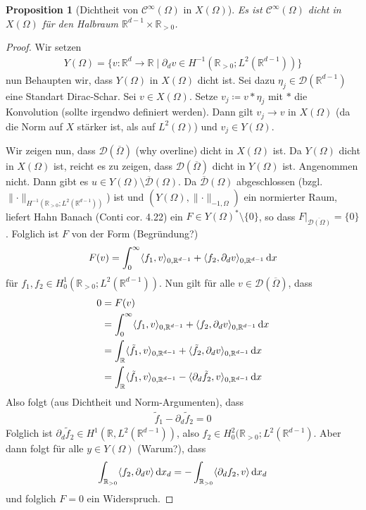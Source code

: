 \documentclass{scrartcl}
\newcounter{everything}
\newtheorem{proposition}[everything]{Proposition}
\def\R{\mathbb{R}}
\newcommand{\cC}{\mathcal{C}}
\newcommand{\cD}{\mathcal{D}}
\newcommand{\dif}[1]{\,\mathrm{d} #1}
\newcommand{\norm}[1]{\lVert #1 \rVert}
\DeclarePairedDelimiter{\inner}{\langle}{\rangle}
\begin{document}
\begin{proposition}[Dichtheit von $\cC^\infty(\Omega)$ in $X(\Omega)$]
Es ist $\cC^\infty(\Omega)$ dicht in $X(\Omega)$ für den Halbraum $\R^{d-1}\times\R_{>0}$.
\end{proposition}
\begin{proof}
	Wir setzen
	\begin{align*}
		Y(\Omega) =\{v\colon\R^d\to\R\mid \partial_dv\in H^{-1}(\R_{>0};L^2(\R^{d-1}))\}
	\end{align*}
	nun Behaupten wir, dass $Y(\Omega)$ in $X(\Omega)$ dicht ist. Sei dazu $\eta_j\in \cD(\R^{d-1})$ eine Standart Dirac-Schar. Sei $v\in X(\Omega)$. Setze $v_j\coloneqq v*\eta_j$ mit $*$ die Konvolution (sollte irgendwo definiert werden). Dann gilt $v_j\to v$ in $X(\Omega)$ (da die Norm auf $X$ stärker ist, als auf $L^2(\Omega)$) und $v_j\in Y(\Omega)$.
	
	Wir zeigen nun, dass $\cD(\overline{\Omega})$ (why overline) dicht in $X(\Omega)$ ist. Da $Y(\Omega)$ dicht in $X(\Omega)$ ist, reicht es zu zeigen, dass $\cD(\overline{\Omega})$ dicht in $Y(\Omega)$ ist.
	Angenommen nicht. Dann gibt es $u\in Y(\Omega)\setminus\overline{\cD}(\Omega)$. Da $\overline{\cD}(\Omega)$ abgeschlossen (bzgl. $\norm{\cdot}_{H^{-1}(\R_{>0};L^2(\R^{d-1}))}$) ist und $(Y(\Omega),\norm{\cdot}_{-1,\Omega})$ ein normierter Raum, liefert Hahn Banach (Conti cor. 4.22) ein $F\in Y(\Omega)^*\setminus\{0\}$, so dass $F\vert_{\overline{\cD(\Omega)}} = \{0\}$. Folglich ist $F$ von der Form (Begründung?)
	\begin{align*}
		F(v) =\int_0^\infty\inner{f_1,v}_{0,\R^{d-1}}+\inner{f_2,\partial_dv}_{0,\R^{d-1}}\dif x
	\end{align*}
	für $f_1,f_2\in H_0^1(\R_{>0};L^2(\R^{d-1}))$.
	Nun gilt für alle $v\in \cD(\overline{\Omega})$, dass
	\begin{align*}
		0&=F(v) \\
		&=\int_0^\infty\inner{f_1,v}_{0,\R^{d-1}}+\inner{f_2,\partial_dv}_{0,\R^{d-1}}\dif x \\
		&=\int_\R\inner{\tilde{f}_1,v}_{0,\R^{d-1}}+\inner{\tilde{f}_2,\partial_dv}_{0,\R^{d-1}}\dif x \\
		&=\int_\R\inner{\tilde{f}_1,v}_{0,\R^{d-1}}-\inner{\partial_d\tilde{f}_2,v}_{0,\R^{d-1}}\dif x \\
	\end{align*}
	Also folgt (aus Dichtheit und Norm-Argumenten), dass
	\begin{align*}
		\tilde{f}_1-\partial_d\tilde{f}_2 = 0
	\end{align*}
	Folglich ist $\partial_d\tilde{f}_2\in H^1(\R,L^2(\R^{d-1}))$, also $f_2\in H_0^2(\R_{>0};L^2(\R^{d-1})$. Aber dann folgt für alle $y\in Y(\Omega)$ (Warum?), dass
	\begin{align*}
		\int_{\R_{>0}}\inner{f_2,\partial_d v}\dif x_d = -\int_{\R_{>0}}\inner{\partial_df_2,v}\dif x_d
	\end{align*}
	und folglich $F=0$ ein Widerspruch.
\end{proof}
\end{document}
